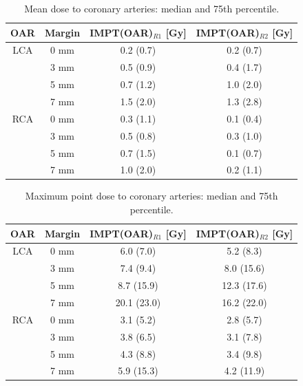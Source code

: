 \begin{table}[H]
  \centering
      \footnotesize
  \caption{Mean dose to coronary arteries: median and 75th percentile.}
  \begin{tabular}{|c|c|c|c|}
    \hline\hline
    OAR & Margin & IMPT(OAR)$_{R1}$ [Gy] & IMPT(OAR)$_{R2}$ [Gy] \\
    \hline
    LCA & 0 mm & 0.2 (0.7) & 0.2 (0.7) \\
    & 3 mm & 0.5 (0.9) & 0.4 (1.7) \\
    & 5 mm & 0.7 (1.2) & 1.0 (2.0) \\
    & 7 mm & 1.5 (2.0) & 1.3 (2.8) \\
    \hline
    RCA & 0 mm & 0.3 (1.1) & 0.1 (0.4) \\
    & 3 mm & 0.5 (0.8) & 0.3 (1.0) \\
    & 5 mm & 0.7 (1.5) & 0.1 (0.7) \\
    & 7 mm & 1.0 (2.0) & 0.2 (1.1) \\ 
    \hline\hline
  \end{tabular}
  \label{tab:meandose_ca}
\end{table}


\begin{table}[H]
  \centering
        \footnotesize
  \caption{Maximum point dose to coronary arteries: median and 75th percentile.}
  \begin{tabular}{|c|c|c|c|}
    \hline\hline
    OAR & Margin & IMPT(OAR)$_{R1}$ [Gy] & IMPT(OAR)$_{R2}$ [Gy] \\
    \hline
    LCA & 0 mm & 6.0 (7.0) & 5.2 (8.3) \\
    & 3 mm & 7.4 (9.4) & 8.0 (15.6) \\
    & 5 mm & 8.7 (15.9) & 12.3 (17.6) \\
    & 7 mm & 20.1 (23.0) & 16.2 (22.0) \\
   \hline
    RCA & 0 mm & 3.1 (5.2) & 2.8 (5.7) \\
    & 3 mm & 3.8 (6.5) & 3.1 (7.8) \\
    & 5 mm & 4.3 (8.8) & 3.4 (9.8) \\
    & 7 mm & 5.9 (15.3) & 4.2 (11.9) \\
    \hline\hline
  \end{tabular}
  \label{tab:maxdose_ca}
\end{table}


